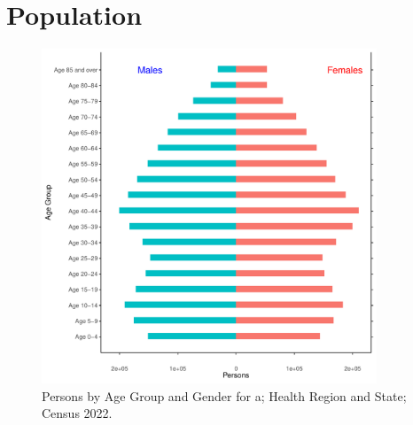 \documentclass{article}
\begin{document}
\pagebreak

\section{Population} 
\label{sect:Pop}

\begin{figure}[h]
	\centering
	\includegraphics[width = 100mm]{../figures/PyramidPlot.pdf}
	\caption{Persons by Age Group and Gender for a; Health Region and State; Census 2022.}
	\label{fig:2ae19629-1a6a-13a3-e055-000000000001}
	\end{figure}
\end{document}
